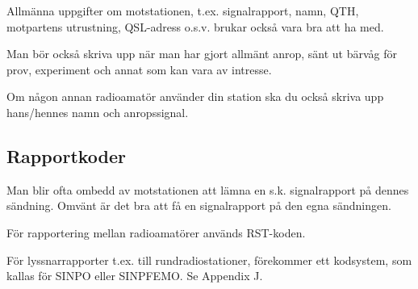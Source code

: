 Allmänna uppgifter om motstationen, t.ex.  signalrapport, namn, QTH,
motpartens utrustning, QSL-adress o.s.v. brukar också vara bra att ha
med.

Man bör också skriva upp när man har gjort allmänt anrop, sänt ut
bärvåg för prov, experiment och annat som kan vara av intresse.

Om någon annan radioamatör använder din station ska du också skriva
upp hans/hennes namn och anropssignal.

\subsection{Rapportkoder}

Man blir ofta ombedd av motstationen att lämna en s.k. signalrapport
på dennes sändning. Omvänt är det bra att få en signalrapport på den
egna sändningen.

För rapportering mellan radioamatörer används RST-koden.

För lyssnarrapporter t.ex. till rundradiostationer, förekommer ett
kodsystem, som kallas för SINPO eller SINPFEMO.  Se Appendix J.

